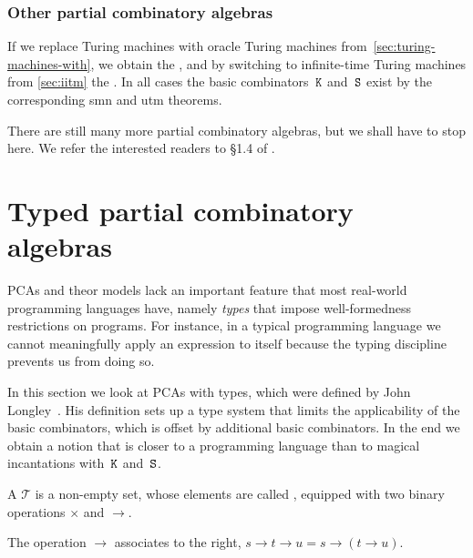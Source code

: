 \subsubsection{Other partial combinatory algebras}
\label{sec:other-pcas}

If we replace Turing machines with oracle Turing machines from~\cref{sec:turing-machines-with}, we obtain the , and by switching to infinite-time Turing machines from \cref{sec:iitm} the . In all cases the basic combinators~$\mathtt{K}$ and~$\mathtt{S}$ exist by the corresponding smn and utm theorems.

There are still many more partial combinatory algebras, but we shall have to stop here. We refer the interested readers to \S1.4 of .




\section{Typed partial combinatory algebras}
\label{sec:tpcas}

PCAs and theor models lack an important feature that most
real-world programming languages have, namely \emph{types} that impose
well-formedness restrictions on programs. For instance, in a typical programming language we cannot meaningfully apply an  expression to itself because the typing discipline prevents us from doing so.

In this section we look at PCAs with types, which were defined by John
Longley~.
His definition sets up a type system that limits the applicability of the basic combinators, which is offset by additional basic combinators. In the end we obtain a notion that is closer to a programming language than to magical incantations with~$\mathtt{K}$ and~$\mathtt{S}$.

\begin{definition}
  A  $\mathcal{T}$ is a non-empty set, whose elements
  are called , equipped with two binary operations $\times$
  and $\to$.
\end{definition}

The operation $\to$ associates to the right, $s \to t \to u = s \to (t \to u)$.

